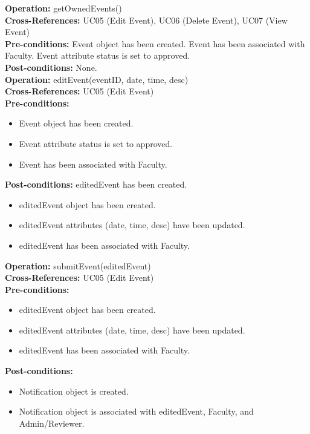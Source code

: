 \textbf{Operation:} getOwnedEvents() \\
\textbf{Cross-References:} UC05 (Edit Event), UC06 (Delete Event), UC07 (View Event) \\
\textbf{Pre-conditions:} Event object has been created. Event has been associated with Faculty. Event attribute status is set to approved. \\
\textbf{Post-conditions:} None. \\

\textbf{Operation:} editEvent(eventID, date, time, desc) \\
\textbf{Cross-References:} UC05 (Edit Event) \\
\textbf{Pre-conditions:}
\begin{itemize}
    \item Event object has been created.
    \item Event attribute status is set to approved.
    \item Event has been associated with Faculty.
\end{itemize}
\textbf{Post-conditions:} editedEvent has been created.
\begin{itemize}
    \item editedEvent object has been created.
    \item editedEvent attributes (date, time, desc) have been updated.
    \item editedEvent has been associated with Faculty.
\end{itemize}

\textbf{Operation:} submitEvent(editedEvent) \\
\textbf{Cross-References:} UC05 (Edit Event) \\
\textbf{Pre-conditions:}
\begin{itemize}
    \item editedEvent object has been created.
    \item editedEvent attributes (date, time, desc) have been updated.
    \item editedEvent has been associated with Faculty.
\end{itemize}
\textbf{Post-conditions:}
\begin{itemize}
    \item Notification object is created.
    \item Notification object is associated with editedEvent, Faculty, and Admin/Reviewer.
\end{itemize}